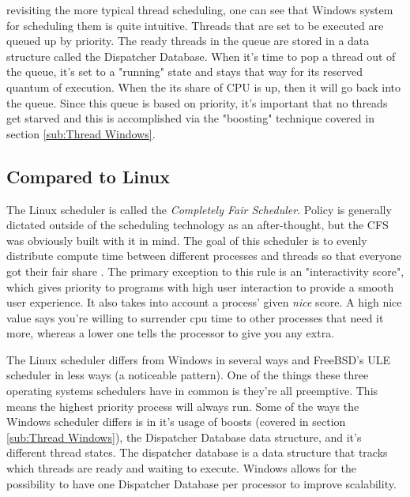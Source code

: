 \documentclass[10pt,draftclsnofoot,onecolumn]{IEEEtran}
\begin{document}
\par revisiting the more typical thread scheduling, one can see that Windows system for scheduling them is quite intuitive.
Threads that are set to be executed are queued up by priority.
The ready threads in the queue are stored in a data structure called the Dispatcher Database.
When it's time to pop a thread out of the queue, it's set to a "running" state and stays that way for its reserved quantum of execution.
When the its share of CPU is up, then it will go back into the queue.
Since this queue is based on priority, it's important that no threads get starved and this is accomplished via the "boosting" technique covered in section \ref{sub:Thread Windows}.

\subsection{Compared to Linux}
\label{sub:Sub Processes Linux}
\par The Linux scheduler is called the \textit{Completely Fair Scheduler}.
Policy is generally dictated outside of the scheduling technology as an after-thought, but the CFS was obviously built with it in mind.
The goal of this scheduler is to evenly distribute compute time between different processes and threads so that everyone got their fair share \cite{linux:1}.
The primary exception to this rule is an "interactivity score", which gives priority to programs with high user interaction to provide a smooth user experience.
It also takes into account a process' given \textit{nice} score.
A high nice value says you're willing to surrender cpu time to other processes that need it more, whereas a lower one tells the processor to give you any extra.

\par The Linux scheduler differs from Windows in several ways and FreeBSD's ULE scheduler in less ways (a noticeable pattern).
One of the things these three operating systems schedulers have in common is they're all preemptive.
This means the highest priority process will always run.
Some of the ways the Windows scheduler differs is in it's usage of boosts (covered in section \ref{sub:Thread Windows}), the Dispatcher Database data structure, and it's different thread states.
The dispatcher database is a data structure that tracks which threads are ready and waiting to execute.
Windows allows for the possibility to have one Dispatcher Database per processor to improve scalability.
\end{document}
